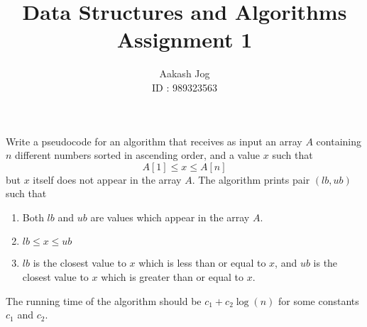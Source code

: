\documentclass[fleqn, a4paper, 11pt, oneside]{amsart}
\title
[
	DS\&A : Assignment 1
]
{
	Data Structures and Algorithms\\
	Assignment 1
}
\author
{
	Aakash Jog\\
	ID : 989323563
}
\date{\formatdate{8}{3}{2016}}
\theoremstyle{definition}
\theoremstyle{theorem}
\begin{document}
\maketitle

\begin{question}
	Write a pseudocode for an algorithm that receives as input an array $A$ containing $n$ different numbers sorted in ascending order, and a value $x$ such that
	\begin{equation*}
		A[1] \le x \le A[n]
	\end{equation*}
	but $x$ itself does not appear in the array $A$.
	The algorithm prints pair $(\mathit{lb},\mathit{ub})$ such that
	\begin{enumerate}
		\item Both $\mathit{lb}$ and $\mathit{ub}$ are values which appear in the array $A$.
		\item $\mathit{lb} \le x \le \mathit{ub}$
		\item $\mathit{lb}$ is the closest value to $x$ which is less than or equal to $x$, and $\mathit{ub}$ is the closest value to $x$ which is greater than or equal to $x$.
	\end{enumerate}
	The running time of the algorithm should be $c_1 + c_2 \log(n)$ for some constants $c_1$ and $c_2$.
\end{question}
\end{document}
